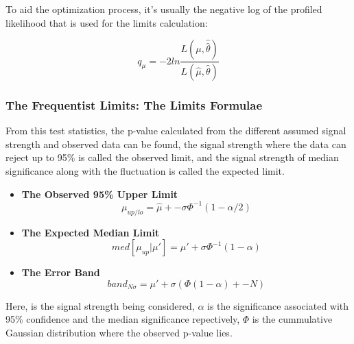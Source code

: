 To aid the optimization process, it's usually the negative log of the profiled likelihood that is used for the limits calculation:

\begin{equation}
    q_{\mu} = -2 ln \frac{L(\mu, \hat{\hat{\theta}})}{L(\hat{\mu}, \hat{\theta})}
\label{teststats}
\end{equation}


\subsubsection{The Frequentist Limits: The Limits Formulae}
\label{freq:limits}

From this test statistics, the p-value calculated from the different assumed signal strength and observed data can be found, the signal strength where the data can reject up to 95\% is called the observed limit, and the signal strength of median significance along with the fluctuation is called the expected limit. 

\begin{itemize}


\item \textbf{The Observed 95\% Upper Limit}
\begin{equation}
\mu_{up/lo} = \hat{\mu} +- \sigma\Phi^{-1}(1-\alpha/2)
\end{equation}

\item \textbf{The Expected Median Limit}
\begin{equation}
    med[\mu_{up}|\mu'] = \mu' + \sigma\Phi^{-1}(1-\alpha) 
\end{equation}

\item \textbf{The Error Band}
\begin{equation}
    band_{N\sigma} = \mu' + \sigma(\Phi(1-\alpha)+-N)
\end{equation}

\end{itemize}


Here, \mu is the signal strength being considered, $\alpha$ is the significance associated with 95\% confidence and the median significance repectively, $\Phi$ is the cummulative Gaussian distribution where the observed p-value lies.

